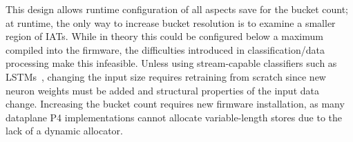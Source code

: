 

This design allows runtime configuration of all aspects save for the bucket count; at runtime, the only way to increase bucket resolution is to examine a smaller region of IATs.
While in theory this could be configured below a maximum compiled into the firmware, the difficulties introduced in classification/data processing make this infeasible.
Unless using stream-capable classifiers such as LSTMs~\cite{DBLP:journals/neco/HochreiterS97}, changing the input size requires retraining from scratch since new neuron weights must be added and structural properties of the input data change.
Increasing the bucket count requires new firmware installation, as many dataplane P4 implementations cannot allocate variable-length stores due to the lack of a dynamic allocator.

